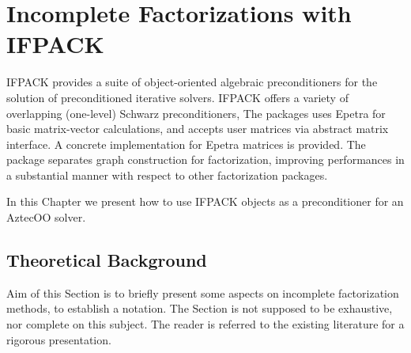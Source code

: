 % 
% 
% 
%   
%   
% 
% 

\chapter{Incomplete Factorizations with IFPACK}
\label{chap:ifpack}

IFPACK provides a suite of object-oriented algebraic preconditioners for
the solution of preconditioned iterative solvers. IFPACK offers a
variety of overlapping (one-level) Schwarz preconditioners, The packages
uses Epetra for basic matrix-vector calculations, and accepts user
matrices via abstract matrix interface. A concrete implementation for
Epetra matrices is provided. The package separates graph construction
for factorization, improving performances in a substantial manner with
respect to other factorization packages.

In this Chapter we present how to use IFPACK objects as a preconditioner
for an AztecOO solver. 


\section{Theoretical Background}
\label{sec:ifpack_theoretical}

Aim of this Section is to briefly present some aspects on incomplete
factorization methods, to establish a notation. The Section is not
supposed to be exhaustive, nor complete on this subject. The reader is
referred to the existing literature for a rigorous presentation.

